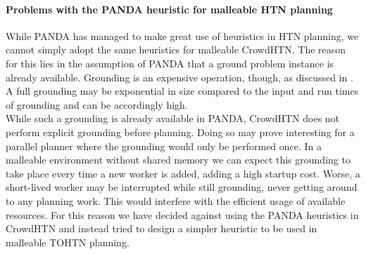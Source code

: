 \paragraph{Problems with the PANDA heuristic for malleable HTN planning}
While PANDA has managed to make great use of heuristics in HTN planning, we cannot simply adopt the same heuristics for malleable CrowdHTN. The reason for this lies in the assumption of PANDA that a ground problem instance is already available. Grounding is an expensive operation, though, as discussed in \cite{behnke2020succinct}. A full grounding may be exponential in size compared to the input and run times of grounding and can be accordingly high. \\
While such a grounding is already available in PANDA, CrowdHTN does not perform explicit grounding before planning. Doing so may prove interesting for a parallel planner where the grounding would only be performed once. In a malleable environment without shared memory we can expect this grounding to take place every time a new worker is added, adding a high startup cost. Worse, a short-lived worker may be interrupted while still grounding, never getting around to any planning work. This would interfere with the efficient usage of available resources. For this reason we have decided against using the PANDA heuristics in CrowdHTN and instead tried to design a simpler heuristic to be used in malleable TOHTN planning.

